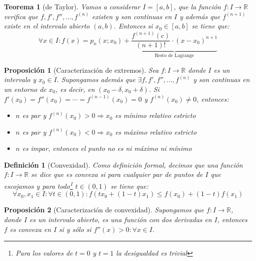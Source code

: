 \documentclass[10pt,a4paper,openright]{book}
\newtheorem{teorema}{Teorema}[chapter]
\newtheorem{proposicion}{Proposición}[chapter]
\newtheorem{definicion}{Definición}[chapter]
\begin{document}
\begin{teorema}[de Taylor]
Vamos a considerar $I=[a,b]$, que la función $f:I\rightarrow \mathbb R$ verifica que $f,f',f'', ..., f^{(n)}$ existen y son continuas en $I$ y además que $f^{(n+1)}$ existe en el intervalo abierto $(a,b)$. Entonces si $x_0\in [a,b]$ se tiene que:
$$\forall x\in I: f(x)=p_n(x; x_0)+\underbrace{\frac{f^{(n+1)}(c)}{(n+1)!}\cdot (x-x_0)^{n+1}}_{\mbox{Resto de Lagrange}}$$
\end{teorema}

\begin{proposicion}[Caracterización de extremos]
Sea $f:I\rightarrow \mathbb R$ donde $I$ es un intervalo y $x_0\in \mathring{I}$. Supongamos además que $\exists f, f', f'', ..., f^{(n)}$ y son continuas en un entorno de $x_0$, es decir, en $(x_0-\delta, x_0+\delta)$. Si $f'(x_0)=f''(x_0)=\cdots = f^{(n-1)}(x_0)=0$ y $f^{(n)}(x_0)\neq 0$, entonces:
\begin{itemize}
\item $n$ es par y $f^{(n)}(x_0)>0\Rightarrow x_0$ es mínimo relativo estricto
\item $n$ es par y $f^{(n)}(x_0)<0 \Rightarrow x_0$ es máximo relativo estricto

\item $n$ es impar, entonces el punto no es ni máximo ni mínimo
\end{itemize}
\end{proposicion}

\begin{definicion}[Convexidad]
Como definición formal, decimos que una función $f:I\rightarrow\mathbb R$ se dice que es convexa si para cualquier par de puntos de $I$ que escojamos y para todo\footnote{Para los valores de $t=0$ y $t=1$ la desigualdad es trivial} $t\in (0,1)$ se tiene que:
$$\forall x_0,x_1 \in I: \forall t\in (0,1): f(tx_0+(1-t)x_1)\leq f(x_0)+(1-t)f(x_1)$$
\end{definicion}

\begin{proposicion}[Caracterización de convexidad]
Supongamos que $f:I\rightarrow\mathbb R$, donde $I$ es un intervalo abierto, es una función con dos derivadas en $I$, entonces $f$ es convexa en $I$ si y sólo si $f''(x)>0: \forall x\in I$.
\end{proposicion}
\end{document}
